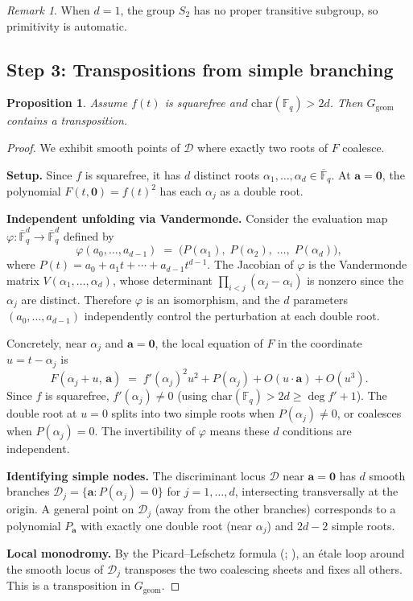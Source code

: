 \documentclass[11pt, a4paper]{article}
\newtheorem{proposition}[theorem]{Proposition}
\theoremstyle{definition}
\theoremstyle{remark}
\newtheorem{remark}[theorem]{Remark}
\newcommand{\Fq}{\mathbb{F}_q}
\newcommand{\Fqbar}{\overline{\mathbb{F}}_q}
\begin{document}
\begin{remark}\label{rem:d1_primitive}
When $d = 1$, the group $S_2$ has no proper transitive subgroup,
so primitivity is automatic.
\end{remark}

\subsection{Step 3: Transpositions from simple branching}
\label{subsec:transposition}

\begin{proposition}\label{prop:transposition}
Assume $f(t)$ is squarefree and $\mathrm{char}(\Fq) > 2d$.
Then $G_{\mathrm{geom}}$ contains a transposition.
\end{proposition}

\begin{proof}
We exhibit smooth points of $\mathcal{D}$ where exactly two roots
of $F$ coalesce.

\textbf{Setup.}
Since $f$ is squarefree, it has $d$ distinct roots
$\alpha_1, \ldots, \alpha_d \in \Fqbar$.
At $\mathbf{a} = \mathbf{0}$, the polynomial
$F(t, \mathbf{0}) = f(t)^2$ has each $\alpha_j$ as a double root.

\textbf{Independent unfolding via Vandermonde.}
Consider the evaluation map
$\varphi : \Fqbar^d \to \Fqbar^d$ defined by
\[
    \varphi(a_0, \ldots, a_{d-1})
    \;=\;
    \bigl(P(\alpha_1),\; P(\alpha_2),\;\ldots,\; P(\alpha_d)\bigr),
\]
where $P(t) = a_0 + a_1 t + \cdots + a_{d-1} t^{d-1}$.
The Jacobian of $\varphi$ is the Vandermonde matrix
$V(\alpha_1, \ldots, \alpha_d)$, whose determinant
$\prod_{i<j}(\alpha_j - \alpha_i)$
is nonzero since the $\alpha_j$ are distinct.
Therefore $\varphi$ is an isomorphism,
and the $d$ parameters $(a_0, \ldots, a_{d-1})$
independently control the perturbation at each double root.

Concretely, near $\alpha_j$ and $\mathbf{a} = \mathbf{0}$,
the local equation of $F$ in the coordinate $u = t - \alpha_j$ is
\[
    F(\alpha_j + u,\, \mathbf{a})
    \;=\;
    f'(\alpha_j)^2 u^2 + P(\alpha_j) + O(u \cdot \mathbf{a})
    + O(u^3).
\]
Since $f$ is squarefree, $f'(\alpha_j) \ne 0$
(using $\mathrm{char}(\Fq) > 2d \ge \deg f'+ 1$).
The double root at $u = 0$ splits into two simple roots when
$P(\alpha_j) \ne 0$, or coalesces when $P(\alpha_j) = 0$.
The invertibility of $\varphi$ means these $d$ conditions
are independent.

\textbf{Identifying simple nodes.}
The discriminant locus $\mathcal{D}$ near $\mathbf{a} = \mathbf{0}$
has $d$ smooth branches
$\mathcal{D}_j = \{\mathbf{a} : P(\alpha_j) = 0\}$
for $j = 1, \ldots, d$,
intersecting transversally at the origin.
A general point on $\mathcal{D}_j$
(away from the other branches) corresponds to a polynomial
$P_\mathbf{a}$ with exactly one double root (near $\alpha_j$)
and $2d - 2$ simple roots.

\textbf{Local monodromy.}
By the Picard--Lefschetz formula
(\cite[Exp.~XV, \S3]{SGA7}; \cite[\S I.6]{katz1988}),
an \'etale loop around the smooth locus of $\mathcal{D}_j$
transposes the two coalescing sheets and fixes all others.
This is a transposition in $G_{\mathrm{geom}}$.
\end{proof}
\end{document}
